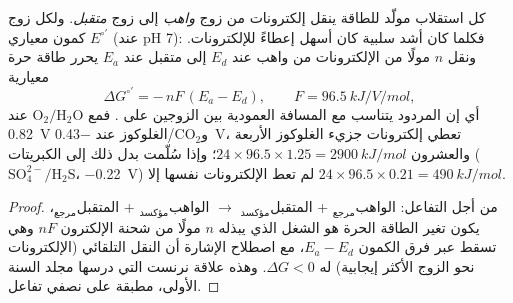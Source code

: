 \begin{theorem}\label{thm:b2:microbial-metabolism:redox}
كل استقلاب مولّد للطاقة ينقل إلكترونات من زوج \emph{واهب} إلى زوج
\emph{متقبل}. ولكل زوج كمون معياري $E^{\circ\prime}$ (عند pH 7):
فكلما كان أشد سلبية كان أسهل إعطاءً للإلكترونات. ونقل $n$ مولًا من
الإلكترونات من واهب عند $E_d$ إلى متقبل عند $E_a$ يحرر طاقة حرة
معيارية
\[
\Delta G^{\circ\prime} = -\,n F\,(E_a - E_d), \qquad F = \qty{96.5}{kJ/V/mol},
\]
أي إن المردود يتناسب مع المسافة العمودية بين الزوجين على
\emph{}. فمع $\mathrm{O_2/H_2O}$ عند \qty{+0.82}{V}
و$\mathrm{CO_2}$/الغلوكوز عند
\qty{-0.43}{V}، تعطي إلكترونات جزيء الغلوكوز الأربعة والعشرون
$24\times 96.5\times 1.25 = \qty{2900}{kJ/mol}$؛ وإذا سُلّمت بدل ذلك
إلى الكبريتات ($\mathrm{SO_4^{2-}/H_2S}$، \qty{-0.22}{V}) لم تعط
الإلكترونات نفسها إلا $24\times 96.5\times 0.21 = \qty{490}{kJ/mol}$.
\end{theorem}
\begin{proof}
من أجل التفاعل: الواهب$_{\text{مرجع}}$ + المتقبل$_{\text{مؤكسد}}$
$\to$ الواهب$_{\text{مؤكسد}}$ + المتقبل$_{\text{مرجع}}$، يكون تغير
الطاقة الحرة هو الشغل الذي يبذله $n$ مولًا من شحنة الإلكترون $nF$
وهي تسقط عبر فرق الكمون $E_a - E_d$، مع اصطلاح الإشارة أن النقل
التلقائي (الإلكترونات نحو الزوج الأكثر إيجابية) له $\Delta G < 0$.
وهذه علاقة نرنست التي درسها مجلد السنة الأولى، مطبقة على نصفي
تفاعل.
\end{proof}

